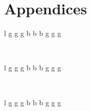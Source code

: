 \documentclass[12pt]{report}
\begin{document}
\newpage
{}
{}
\chapter*{Appendices}

\scriptsize
\begin{center}
\begin{longtable}{l g g g b b b g g g}
\caption{Losses of Rio de Janeiro}\\

\label{tab:clusters_size} 
\end{longtable} 
\end{center} 
\normalsize


\scriptsize
\begin{center}
\begin{longtable}{l g g g b b b g g g}
\caption{Losses of Paraná}\\

\label{tab:clusters_size} 
\end{longtable} 
\end{center} 
\normalsize

\scriptsize
\begin{center}
\begin{longtable}{l g g g b b b g g g}
\caption{Losses of Ceará}\\

\label{tab:clusters_size} 
\end{longtable} 
\end{center} 
\normalsize
\end{document}
